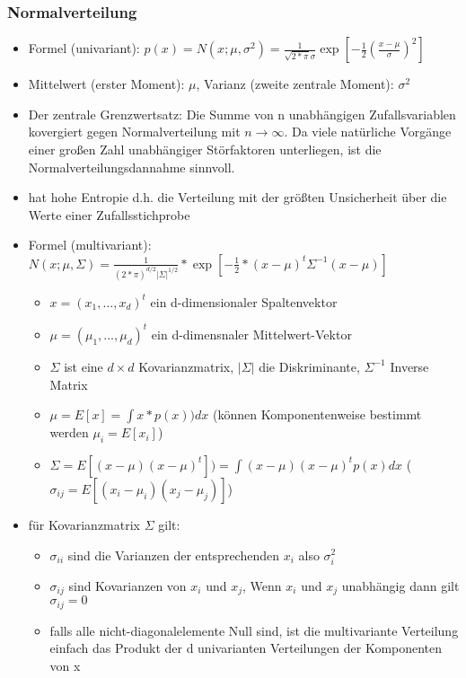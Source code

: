 \documentclass{article} %
\begin{document}
		\subsubsection{Normalverteilung}
		\begin{itemize}
			\item Formel (univariant): $p(x) = N(x;\mu,\sigma^2) = \frac{1}{\sqrt{2*\pi}\sigma}\exp[-\frac{1}{2}(\frac{x-\mu}{\sigma})^2]$
			\item Mittelwert (erster Moment): $\mu$, Varianz (zweite zentrale Moment): $\sigma^2$
			\item Der zentrale Grenzwertsatz: Die Summe von n unabhängigen Zufallsvariablen kovergiert gegen Normalverteilung mit $n\rightarrow \infty$. Da viele natürliche Vorgänge einer großen Zahl unabhängiger Störfaktoren unterliegen, ist die Normalverteilungsdannahme sinnvoll.
			\item hat hohe Entropie d.h. die Verteilung mit der größten Unsicherheit über die Werte einer Zufallsstichprobe
			\item Formel (multivariant): $N(x;\mu,\Sigma) = \frac{1}{(2*\pi)^{d/2}|\Sigma|^{1/2}}*\exp[-\frac{1}{2}*(x-\mu)^t\Sigma^{-1}(x-\mu)]$ 
			\begin{itemize}
				\item $x = (x_1,\dots,x_d)^t$ ein d-dimensionaler Spaltenvektor
				\item $\mu = (\mu_1,\dots,\mu_d)^t$ ein d-dimensnaler Mittelwert-Vektor
				\item $\Sigma$ ist eine $d\times d$ Kovarianzmatrix, $|\Sigma|$ die Diskriminante, $\Sigma^{-1}$ Inverse Matrix
				\item $\mu = E[x] = \int x*p(x)) dx$ (können Komponentenweise bestimmt werden $\mu_i = E[x_i]$)
				\item $\Sigma = E[(x-\mu)(x-\mu)^t] ) = \int (x-\mu)(x-\mu)^tp(x)dx$ ($\sigma_{ij} = E[(x_i-\mu_i)(x_j-\mu_j)]$)
			\end{itemize}
			\item für Kovarianzmatrix $\Sigma$ gilt:
			\begin{itemize}
				\item $\sigma_{ii}$ sind die Varianzen der entsprechenden $x_i$ also $\sigma^2_i$
				\item $\sigma_{ij}$ sind Kovarianzen von $x_i$ und $x_j$, Wenn $x_i$ und $x_j$ unabhängig dann gilt $\sigma_{ij} = 0$
				\item falls alle nicht-diagonalelemente Null sind, ist die multivariante Verteilung einfach das Produkt der d univarianten Verteilungen der Komponenten von x

\end{itemize}
\end{itemize}
\end{document}
